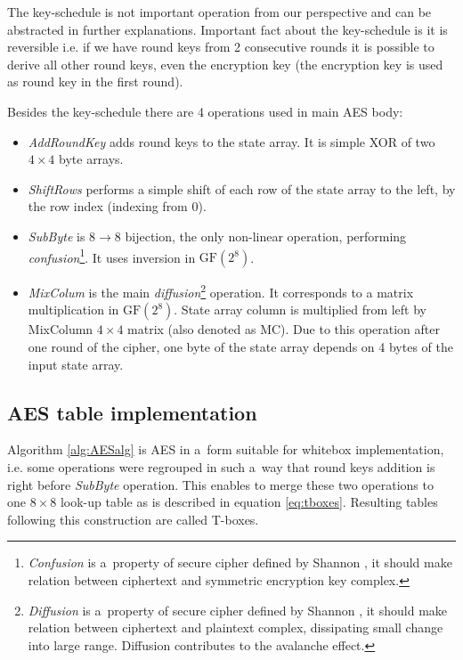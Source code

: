 \documentclass[11pt,oneside,final]{fithesis2}
\newcommand{\gfe}{\ensuremath{\text{GF}\left(2^8\right)}}
\begin{document}
    The key-schedule is not important operation from our perspective and can be abstracted in further explanations. Important fact about the key-schedule is it is reversible i.e. 
    if we have round keys from 2 consecutive rounds it is possible to derive all other round keys, even the encryption key (the encryption key is used as round key in the first round).
    
    Besides the key-schedule there are 4 operations used in main AES body:
    \begin{itemize}
     \item \emph{AddRoundKey} adds round keys to the state array. It is simple XOR of two $4\times4$ byte arrays.
     \item \emph{ShiftRows} performs a simple shift of each row of the state array to the left, by the row index (indexing from 0).
     \item \emph{SubByte} is $8 \rightarrow 8$ bijection, the only non-linear operation, performing 
	\emph{confusion}\footnote{\emph{Confusion} is a~property of secure cipher defined by Shannon \citep{shannon-otp}, it should make relation between ciphertext and symmetric encryption
	    key complex.}. It uses inversion in $\gfe$.
     \item \emph{MixColum} is the main \emph{diffusion}\footnote{\emph{Diffusion} is a~property of secure cipher defined by Shannon \citep{shannon-otp}, it should make relation between
	    ciphertext and plaintext complex, dissipating small change into large range. Diffusion contributes to the avalanche effect. } operation. It corresponds to a matrix multiplication in $\gfe$. 
	    State array column is multiplied from left by MixColumn $4 \times 4$ matrix (also denoted as MC). Due to this operation after one round of the cipher, 
	    one byte of the state array depends on 4 bytes of the input state array.
    \end{itemize}
    
    \subsection{AES table implementation}\label{sec:aes_table}
    Algorithm \ref{alg:AESalg} is AES in a~form suitable for whitebox implementation, i.e. some operations were regrouped in such a~way that round keys addition 
    is right before \emph{SubByte} operation. This enables to merge these two operations to one $8\times8$ look-up table as is described in equation \ref{eq:tboxes}.
    Resulting tables following this construction are called T-boxes.
    
\end{document}
